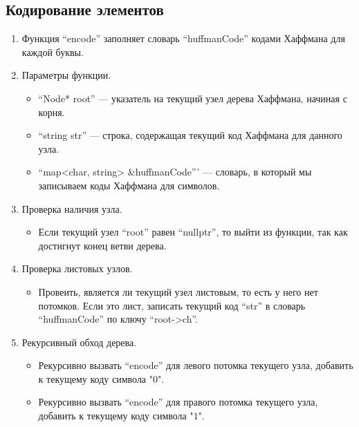 \documentclass[12pt, a4paper]{article}
\begin{document}
\subsection{Кодирование элементов}
\begin{enumerate}
    \item Функция ``encode'' заполняет словарь ``huffmanCode'' кодами Хаффмана для каждой буквы.
    \item Параметры функции.
    \begin{itemize}
        \item[---] ``Node* root'' --- указатель на текущий узел дерева Хаффмана, начиная с корня.
        \item[---] ``string str'' --- строка, содержащая текущий код Хаффмана для данного узла.
        \item[---] ``map<char, string> \&huffmanCode''' --- словарь, в который мы записываем коды Хаффмана для символов. 
    \end{itemize}
    \item Проверка наличия узла.
    \begin{itemize}
        \item[---] Если текущий узел ``root'' равен ``nullptr'', то выйти из функции, так как достигнут конец ветви дерева.
    \end{itemize}
    \item Проверка листовых узлов.
    \begin{itemize}
        \item[---] Провеить, является ли текущий узел листовым, то есть у него нет потомков. Если это лист, записать текущий код ``str'' в словарь ``huffmanCode'' по ключу ``root->ch''. 
    \end{itemize}
    \item Рекурсивный обход дерева.
    \begin{itemize}
        \item[---] Рекурсивно вызвать ``encode'' для левого потомка текущего узла, добавить к текущему коду символа "$0$".
        \item[---] Рекурсивно вызвать ``encode'' для правого потомка текущего узла, добавить к текущему коду символа "$1$".
    \end{itemize}
\end{enumerate}
\end{document}
